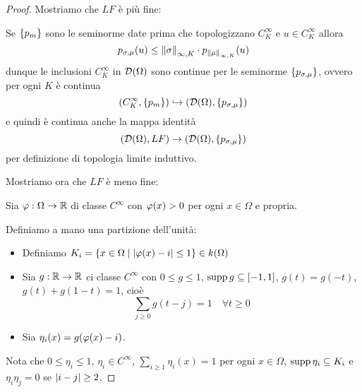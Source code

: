 \begin{proof}
Mostriamo che $LF$ \`e pi\`u fine:

Se $\left\{{p_m}\right\}$ sono le seminorme date prima che topologizzano $C^\infty_K$ e $u\in C^\infty_K$ allora
\[p_{\sigma,\mu}(u)\leq\left\Vert{\sigma}\right\Vert_{\infty,K}\cdot p_{\left\Vert{\mu}\right\Vert_{\infty,K}}(u)\]
dunque le inclusioni $C^\infty_K$ in $\mathcal{D}(\Omega)$ sono continue per le seminorme $\left\{{p_{\sigma,\mu}}\right\}$, ovvero per ogni $K$ \`e continua
\[(C^\infty_K,\left\{{p_m}\right\})\hookrightarrow(\mathcal{D}(\Omega),\left\{{p_{\sigma,\mu}}\right\})\]
e quindi \`e continua anche la mappa identit\`a
\[(\mathcal{D}(\Omega),LF)\to(\mathcal{D}(\Omega),\left\{{p_{\sigma,\mu}}\right\})\]
per definizione di topologia limite induttivo.

\bigskip

\noindent Mostriamo ora che $LF$ \`e meno fine:

Sia $\varphi:\Omega\to\mathbb{R}$ di classe $C^\infty$ con $\varphi(x)>0$ per ogni $x\in \Omega$ e propria.

Definiamo a mano una partizione dell'unit\`a:
\begin{itemize}
    \item Definiamo $K_i=\left\{{x\in\Omega\mid \left|{\varphi(x)-i}\right|\leq 1}\right\}\in k(\Omega)$
    \item Sia $g:\mathbb{R}\to\mathbb{R}$ ci classe $C^\infty$ con $0\leq g\leq 1$, $\operatorname{supp} g\subseteq [-1,1]$, $g(t)=g(-t)$, $g(t)+g(1-t)=1$, cio\`e
\[\sum_{j\geq 0}g(t-j)=1\quad \forall t\geq 0\]
\item Sia $\eta_i(x)=g(\varphi(x)-i)$.
\end{itemize}
Nota che $0\leq \eta_i\leq 1$, $\eta_i\in C^\infty$, $\sum_{i\geq 1}\eta_i(x)=1$ per ogni $x\in \Omega$, $\operatorname{supp} \eta_i\subseteq K_i$ e $\eta_i\eta_j=0$ se $\left|{i-j}\right|\geq 2$.



\end{proof}
